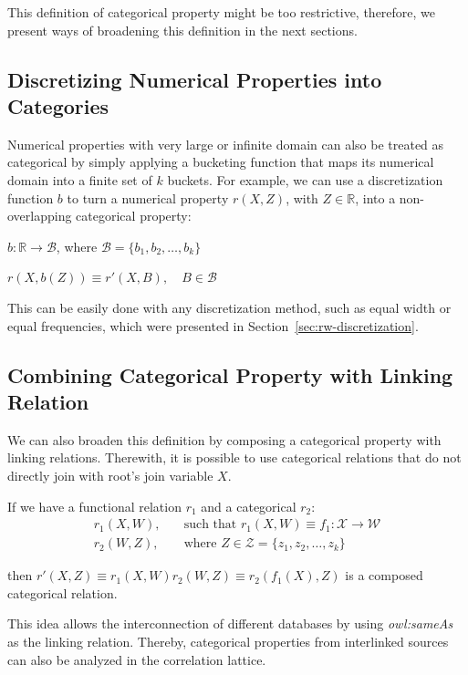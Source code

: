 This definition of categorical property might be too restrictive, therefore, we present ways of broadening this
definition in the next sections.

\subsection{Discretizing Numerical Properties into Categories}

Numerical properties with very large or infinite domain can also be treated as categorical by simply applying a
bucketing function that maps its numerical domain into a finite set of $k$ buckets. For example, we can use a
discretization function $b$ to turn a numerical property $r(X,Z)$, with $Z \in \mathbb{R}$, into a non-overlapping
categorical property:

\begin{center}
 $b: \mathbb{R} \rightarrow \mathcal{B}$, where $\mathcal{B}=\{b_1,b_2,\dots ,b_k \}$
\end{center}

\begin{center}
 $r(X,b(Z)) \equiv r'(X,B) , \quad B \in \mathcal{B}$
\end{center}

This can be easily done with any discretization method, such as equal width or equal frequencies, which were
presented in Section~\ref{sec:rw-discretization}.

\subsection{Combining Categorical Property with Linking Relation}
We can also broaden this definition by composing a categorical property with linking relations. Therewith, it is
possible to use categorical relations that do not directly join with root's join variable $X$.

If we have a functional relation $r_1$ and a categorical $r_2$:
\begin{align*}
r_1(X,W),\quad &\text{such that }r_1(X,W) \equiv f_1 : \mathcal{X} \rightarrow \mathcal{W} \\
r_2(W,Z),\quad &\text{where }Z \in \mathcal{Z}=\{z_1,z_2,\ldots,z_k\} 
\end{align*}

then $r'(X,Z) \equiv r_1(X,W)r_2(W,Z) \equiv r_2(f_1(X),Z)$ is a composed categorical relation. 

This idea allows the interconnection of different databases by using \emph{owl:sameAs} as the linking relation.
Thereby, categorical properties from interlinked sources can also be analyzed in the correlation lattice.

